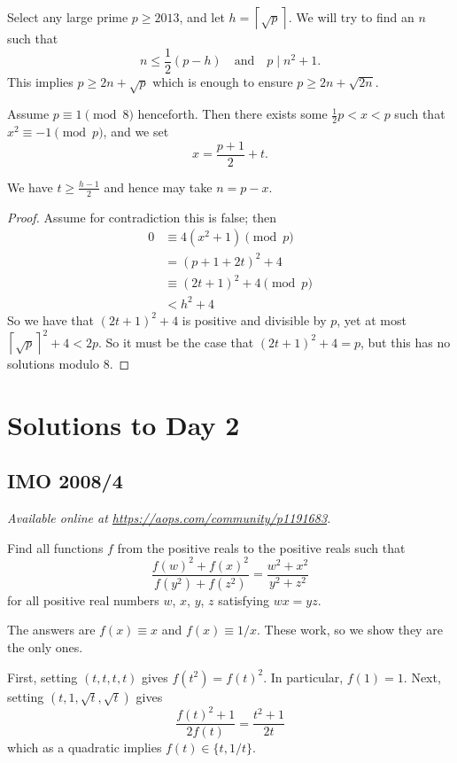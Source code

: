 \documentclass[11pt]{scrartcl}
\begin{document}
Select any large prime $p \ge 2013$,
and let $h = \left\lceil \sqrt p \right\rceil$.
We will try to find an $n$ such that
\[ n \le \frac 12 (p-h) \quad \text{and} \quad p \mid n^2+1. \]
This implies $p \ge 2n+\sqrt{p}$
which is enough to ensure $p \ge 2n + \sqrt{2n}$.

Assume $p \equiv 1 \pmod 8$ henceforth.
Then there exists some $\frac 12 p < x < p$
such that $x^2 \equiv -1 \pmod p$,
and we set \[ x = \frac{p+1}{2} + t. \]
\begin{claim*}
  We have $t \ge \frac{h-1}{2}$ and hence may take $n = p-x$.
\end{claim*}
\begin{proof}
Assume for contradiction this is false; then
\begin{align*}
  0 &\equiv  4(x^2+1) \pmod{p} \\
  &= \left( p+1+2t \right)^2 + 4 \\
  &\equiv (2t+1)^2 + 4 \pmod{p} \\
  &< h^2+4
\end{align*}
So we have that $(2t+1)^2+4$ is positive and divisible by $p$,
yet at most $\left\lceil \sqrt{p} \right\rceil^2 + 4 < 2p$.
So it must be the case that $(2t+1)^2+4 = p$,
but this has no solutions modulo $8$.
\end{proof}
\pagebreak

\section{Solutions to Day 2}
\subsection{IMO 2008/4}
\textsl{Available online at \url{https://aops.com/community/p1191683}.}
\begin{mdframed}[style=mdpurplebox,frametitle={Problem statement}]
Find all functions $f$ from the positive reals to the positive reals such that
\[ \frac{f(w)^2 + f(x)^2}{f(y^2)+f(z^2)} = \frac{w^2+x^2}{y^2+z^2} \]
for all positive real numbers $w$, $x$, $y$, $z$ satisfying $wx=yz$.
\end{mdframed}
The answers are $f(x) \equiv x$ and $f(x) \equiv 1/x$.
These work, so we show they are the only ones.

First, setting $(t,t,t,t)$ gives $f(t^2) = f(t)^2$.
In particular, $f(1) = 1$.
Next, setting $(t, 1, \sqrt t, \sqrt t)$ gives
\[ \frac{f(t)^2 + 1}{2f(t)} = \frac{t^2 + 1}{2t} \]
which as a quadratic implies $f(t) \in \{t, 1/t\}$.
\end{document}
